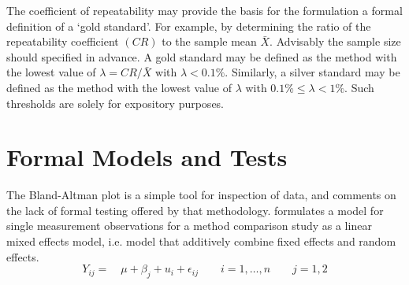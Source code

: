 \documentclass[12pt, a4paper]{report}
\theoremstyle{plain}
\theoremstyle{definition}
\theoremstyle{remark}
\begin{document}
	
	The coefficient of repeatability may provide the basis for the formulation a formal definition of a `gold standard'. For example, by determining the ratio of the repeatability coefficient $(CR)$ to the sample mean $\bar{X}$. Advisably the sample size should specified in advance. A gold standard may be defined as the method with the lowest value of $\lambda = CR /\bar{X}$ with $\lambda < 0.1\%$. Similarly, a silver standard may be defined as the method with the lowest value of $\lambda $ with $0.1\% \leq \lambda < 1\%$. Such thresholds are solely for expository purposes.
	
	
	
\section{Formal Models and Tests}
The Bland-Altman plot is a simple tool for inspection of data, and
\citet{Kinsella} comments on the lack of formal testing offered by
that methodology. \citet{Kinsella} formulates a model for
single measurement observations for a method comparison study as a
linear mixed effects model, i.e. model that additively combine
fixed effects and random effects.
\[
Y_{ij} =\quad \mu + \beta_{j} + u_{i} + \epsilon_{ij} \qquad i = 1,\dots,n
\qquad j=1,2\]
\end{document}
